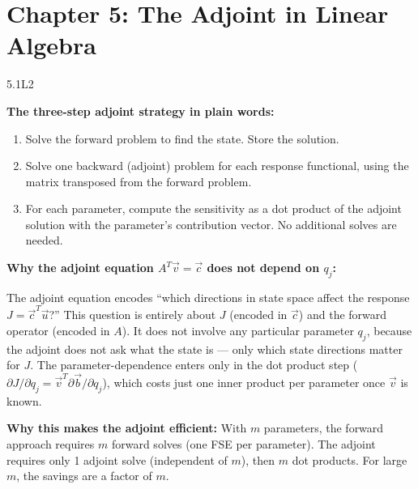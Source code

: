 
\section{Chapter 5: The Adjoint in Linear Algebra}

\begin{solution}{5.1}{L2}

\solanswer

\textbf{The three-step adjoint strategy in plain words:}

\begin{enumerate}
\item Solve the forward problem to find the state. Store the solution.
\item Solve one backward (adjoint) problem for each response functional,
      using the matrix transposed from the forward problem.
\item For each parameter, compute the sensitivity as a dot product of
      the adjoint solution with the parameter's contribution vector.
      No additional solves are needed.
\end{enumerate}

\textbf{Why the adjoint equation $A^T\vec{v} = \vec{c}$ does not depend on $q_j$:}

The adjoint equation encodes ``which directions in state space affect
the response $J = \vec{c}^T\vec{u}$?'' This question is entirely
about $J$ (encoded in $\vec{c}$) and the forward operator (encoded in $A$).
It does not involve any particular parameter $q_j$, because the adjoint
does not ask what the state is — only which state directions matter for $J$.
The parameter-dependence enters only in the dot product step
($\partial J/\partial q_j = \vec{v}^T \partial\vec{b}/\partial q_j$),
which costs just one inner product per parameter once $\vec{v}$ is known.

\textbf{Why this makes the adjoint efficient:}
With $m$ parameters, the forward approach requires $m$ forward solves
(one FSE per parameter). The adjoint requires only 1 adjoint solve
(independent of $m$), then $m$ dot products. For large $m$, the
savings are a factor of $m$.


\end{solution}

